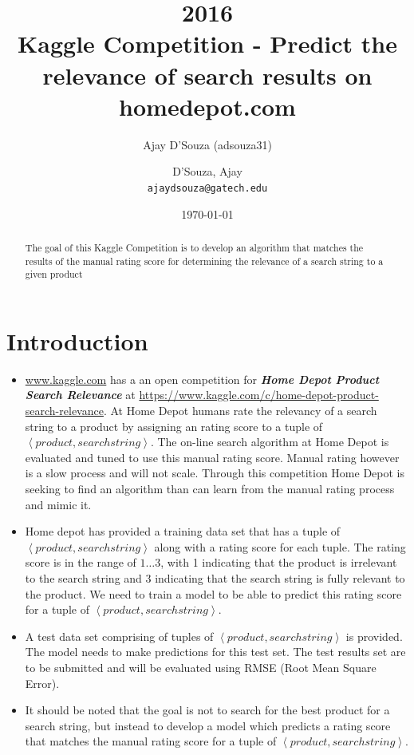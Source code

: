 \documentclass[twoside,12pt]{article}
\title{
2016\\
Kaggle Competition - Predict the relevance of search results on homedepot.com 
}
\author{Ajay D'Souza (adsouza31)}
\author{
  D'Souza, Ajay\\
  \texttt{ajaydsouza@gatech.edu}
}
\date{\today}
\newcommand{\tuple}[1]{\ensuremath{\left \langle #1 \right \rangle }}
\begin{document}
\maketitle

\begin{abstract}
The goal of this Kaggle Competition is to develop an algorithm that matches the results of the manual rating score for determining the relevance of a search string to a given product
\end{abstract}

\pagebreak
\tableofcontents

\pagebreak
\listoffigures
\listoftables

\pagebreak



%
%
\section{Introduction}
\label{Introduction}
\begin{itemize}
\item
\url{www.kaggle.com} has a an open competition for \textbf{\textit{Home Depot Product Search Relevance }} at \url{https://www.kaggle.com/c/home-depot-product-search-relevance}. At Home Depot humans rate the relevancy of a search string to a product by assigning an rating score to a tuple of \tuple{product,searchstring}. The on-line search algorithm at Home Depot is evaluated and tuned to use this manual rating score. Manual rating however is a slow process and will not scale. Through this competition Home Depot is seeking to find an algorithm than can learn from the manual rating process and mimic it.
\item
Home depot has provided a training data set that has a tuple of \tuple{product,searchstring} along with a rating score for each tuple. The rating score is in the range of $1\dots3$, with 1 indicating that the product is irrelevant to the search string and 3 indicating that the search string is fully relevant to the product. We need to train a model to be able to predict this  rating score for a tuple of \tuple{product,searchstring}. 
\item
A test data set comprising of tuples of \tuple{product,searchstring} is provided. The model needs to make predictions for this test set. The test results set are to be submitted and will be evaluated using RMSE (Root Mean Square Error). 
\item
It should be noted that the goal is not to search for the best product for a search string, but instead to develop a model which predicts a rating score that matches the manual rating score for a tuple of \tuple{product,searchstring}.
\end{itemize}
\end{document}
